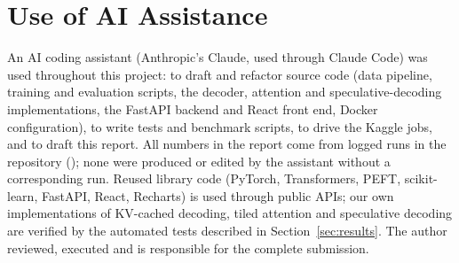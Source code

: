 \section{Use of AI Assistance}
\label{app:ai}
An AI coding assistant (Anthropic's Claude, used through Claude Code) was used throughout this
project: to draft and refactor source code (data pipeline, training and evaluation scripts, the
decoder, attention and speculative-decoding implementations, the FastAPI backend and React
front end, Docker configuration), to write tests and benchmark scripts, to drive the Kaggle jobs, and
to draft this report. All numbers in the report come from logged runs in the repository
(); none were produced or edited by the assistant without a corresponding run.
Reused library code (PyTorch, Transformers, PEFT, scikit-learn, FastAPI, React, Recharts) is used
through public APIs; our own implementations of KV-cached decoding, tiled attention and speculative
decoding are verified by the automated tests described in Section~\ref{sec:results}. The author
reviewed, executed and is responsible for the complete submission.
